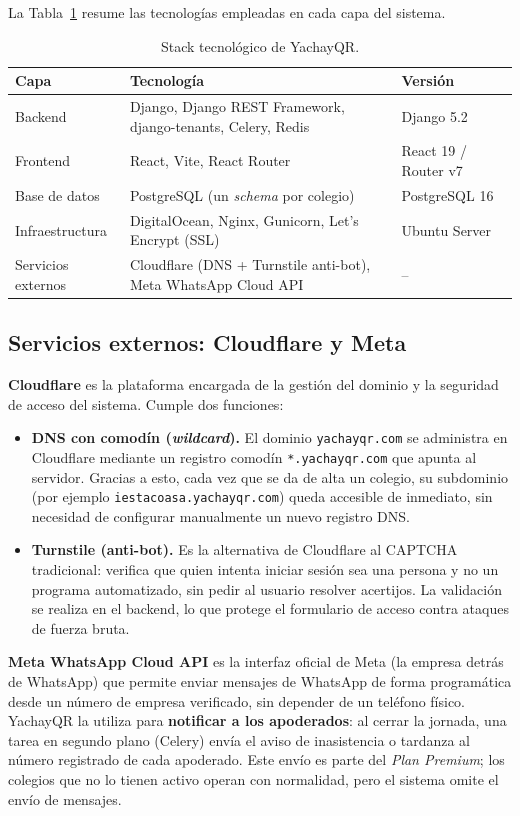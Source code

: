 \documentclass[a4paper,12pt]{article}
\begin{document}
La Tabla~\ref{tab:stack} resume las tecnologías empleadas en cada capa del
sistema.

\begin{table}[H]
\centering
\begin{tabularx}{\linewidth}{p{3.2cm} X p{3.4cm}}
\toprule
\textbf{Capa} & \textbf{Tecnología} & \textbf{Versión} \\
\midrule
Backend &
  Django, Django REST Framework, django-tenants, Celery, Redis &
  Django 5.2 \\
\addlinespace
Frontend &
  React, Vite, React Router &
  React 19 / Router v7 \\
\addlinespace
Base de datos &
  PostgreSQL (un \textit{schema} por colegio) &
  PostgreSQL 16 \\
\addlinespace
Infraestructura &
  DigitalOcean, Nginx, Gunicorn, Let's Encrypt (SSL) &
  Ubuntu Server \\
\addlinespace
Servicios externos &
  Cloudflare (DNS + Turnstile anti-bot), Meta WhatsApp Cloud API &
  -- \\
\bottomrule
\end{tabularx}
\caption{Stack tecnológico de YachayQR.}
\label{tab:stack}
\end{table}

\subsection{Servicios externos: Cloudflare y Meta}

\textbf{Cloudflare} es la plataforma encargada de la gestión del dominio y la
seguridad de acceso del sistema. Cumple dos funciones:

\begin{itemize}[leftmargin=*]
  \item \textbf{DNS con comodín (\textit{wildcard}).} El dominio
  \texttt{yachayqr.com} se administra en Cloudflare mediante un registro
  comodín \texttt{*.yachayqr.com} que apunta al servidor. Gracias a esto, cada
  vez que se da de alta un colegio, su subdominio (por ejemplo
  \texttt{iestacoasa.yachayqr.com}) queda accesible de inmediato, sin necesidad
  de configurar manualmente un nuevo registro DNS.
  \item \textbf{Turnstile (anti-bot).} Es la alternativa de Cloudflare al
  CAPTCHA tradicional: verifica que quien intenta iniciar sesión sea una
  persona y no un programa automatizado, sin pedir al usuario resolver
  acertijos. La validación se realiza en el backend, lo que protege el
  formulario de acceso contra ataques de fuerza bruta.
\end{itemize}

\textbf{Meta WhatsApp Cloud API} es la interfaz oficial de Meta (la empresa
detrás de WhatsApp) que permite enviar mensajes de WhatsApp de forma
programática desde un número de empresa verificado, sin depender de un teléfono
físico. YachayQR la utiliza para \textbf{notificar a los apoderados}: al cerrar
la jornada, una tarea en segundo plano (Celery) envía el aviso de inasistencia
o tardanza al número registrado de cada apoderado. Este envío es parte del
\textit{Plan Premium}; los colegios que no lo tienen activo operan con
normalidad, pero el sistema omite el envío de mensajes.
\end{document}
